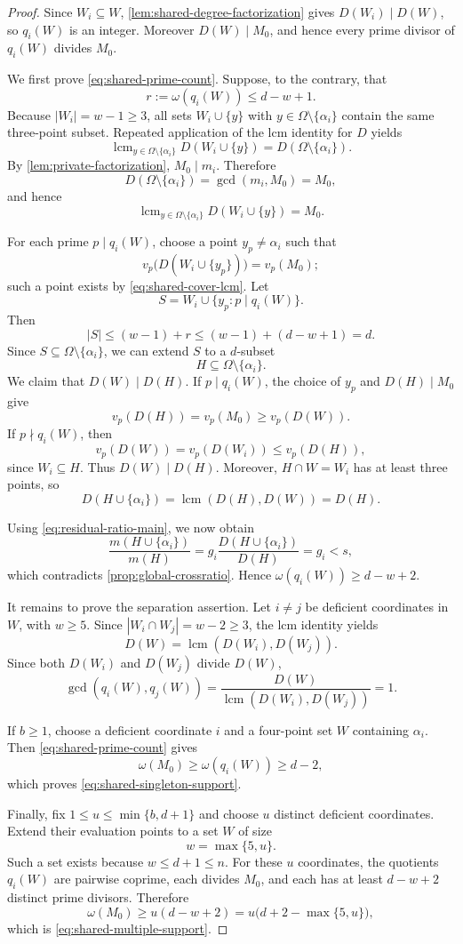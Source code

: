\documentclass[11pt,onecolumn]{IEEEtran}
\newcommand{\lcmop}{\operatorname{lcm}}
\begin{document}
\begin{proof}
Since $W_i\subseteq W$, \cref{lem:shared-degree-factorization} gives
$D(W_i)\mid D(W)$, so $q_i(W)$ is an integer.  Moreover
$D(W)\mid M_0$, and hence every prime divisor of $q_i(W)$
divides $M_0$.

We first prove \eqref{eq:shared-prime-count}.  Suppose, to the contrary,
that
\[
r:=\omega(q_i(W))\le d-w+1.
\]
Because $|W_i|=w-1\ge3$, all sets $W_i\cup\{y\}$ with
$y\in\Omega\setminus\{\alpha_i\}$ contain the same three-point
subset.  Repeated application of the lcm identity for $D$ yields
\[
\lcmop_{y\in\Omega\setminus\{\alpha_i\}}D(W_i\cup\{y\})
=
D(\Omega\setminus\{\alpha_i\}).
\]
By \cref{lem:private-factorization},
$M_0\mid m_i$.  Therefore
\[
D(\Omega\setminus\{\alpha_i\})
=
\gcd(m_i,M_0)
=
M_0,
\]
and hence
\begin{equation}
\lcmop_{y\in\Omega\setminus\{\alpha_i\}}D(W_i\cup\{y\})=M_0.
\label{eq:shared-cover-lcm}
\end{equation}

For each prime $p\mid q_i(W)$, choose a point
$y_p\ne\alpha_i$ such that
\[
v_p\bigl(D(W_i\cup\{y_p\})\bigr)
=
v_p(M_0);
\]
such a point exists by \eqref{eq:shared-cover-lcm}.  Let
\[
S=W_i\cup\{y_p:p\mid q_i(W)\}.
\]
Then
\[
|S|
\le
(w-1)+r
\le
(w-1)+(d-w+1)
=d.
\]
Since $S\subseteq\Omega\setminus\{\alpha_i\}$, we can extend $S$ to
a $d$-subset
\[
H\subseteq\Omega\setminus\{\alpha_i\}.
\]
We claim that $D(W)\mid D(H)$. If $p\mid q_i(W)$,
the choice of $y_p$ and $D(H)\mid M_0$ give
\[
v_p(D(H))=v_p(M_0)\ge v_p(D(W)).
\]
If $p\nmid q_i(W)$, then
\[
v_p(D(W))=v_p(D(W_i))\le v_p(D(H)),
\]
since $W_i\subseteq H$. Thus $D(W)\mid D(H)$.
Moreover, $H\cap W=W_i$ has at least three points, so
\[
D(H\cup\{\alpha_i\})
=\lcmop(D(H),D(W))=D(H).
\]

Using \eqref{eq:residual-ratio-main}, we now obtain
\[
\frac{m(H\cup\{\alpha_i\})}{m(H)}
=
g_i\frac{D(H\cup\{\alpha_i\})}{D(H)}
=
g_i
<s,
\]
which contradicts \cref{prop:global-crossratio}.  Hence
$\omega(q_i(W))\ge d-w+2$.

It remains to prove the separation assertion.  Let $i\ne j$ be
deficient coordinates in $W$, with $w\ge5$.  Since $|W_i\cap W_j|=w-2\ge3$, the lcm identity yields
\[
D(W)=\lcmop(D(W_i),D(W_j)).
\]
Since both $D(W_i)$ and $D(W_j)$ divide $D(W)$,
\[
\gcd(q_i(W),q_j(W))
=\frac{D(W)}{\lcmop(D(W_i),D(W_j))}=1.
\]

If $b\ge1$, choose a deficient coordinate $i$ and a four-point set
$W$ containing $\alpha_i$.  Then
\eqref{eq:shared-prime-count} gives
\[
\omega(M_0)
\ge
\omega(q_i(W))
\ge
d-2,
\]
which proves \eqref{eq:shared-singleton-support}.

Finally, fix $1\le u\le\min\{b,d+1\}$ and choose $u$ distinct
deficient coordinates. Extend their evaluation points to a set $W$ of size
\[
w=\max\{5,u\}.
\]
Such a set exists because $w\le d+1\le n$.
For these $u$ coordinates, the quotients $q_i(W)$ are pairwise
coprime, each divides $M_0$, and each has at least
$d-w+2$ distinct prime divisors.  Therefore
\[
\omega(M_0)
\ge u(d-w+2)
=u\bigl(d+2-\max\{5,u\}\bigr),
\]
which is \eqref{eq:shared-multiple-support}.
\end{proof}
\end{document}
